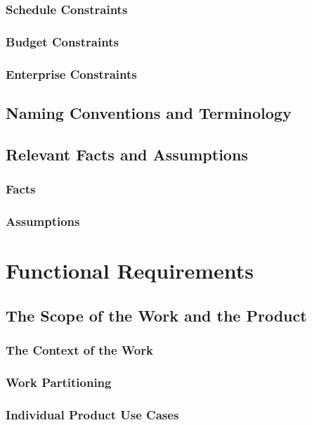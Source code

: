 \documentclass{article}
\begin{document}
\subsubsection{Schedule Constraints}
\subsubsection{Budget Constraints}
\subsubsection{Enterprise Constraints}
\subsection{Naming Conventions and Terminology}
\subsection{Relevant Facts and Assumptions}
\subsubsection{Facts}
\subsubsection{Assumptions}



\section{Functional Requirements}

\subsection{The Scope of the Work and the Product}

\subsubsection{The Context of the Work}

\subsubsection{Work Partitioning}

\subsubsection{Individual Product Use Cases}
\end{document}
